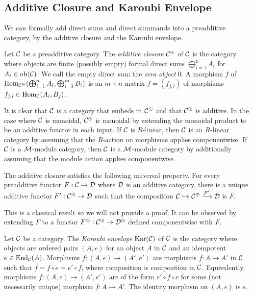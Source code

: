 \subsection*{Additive Closure and Karoubi Envelope}

We can formally add direct sums and direct summands into a preadditive category, by the additive closure and the Karoubi envelope.

\begin{definition}
    Let $\mathcal{C}$ be a preadditive category. The \textit{additive closure} $\mathcal{C}^\oplus$ of $\mathcal{C}$ is the category where objects are finite (possibly empty) formal direct sums $\bigoplus_{i=1}^n A_i$ for $A_i \in \operatorname{ob}(\mathcal{C})$. We call the empty direct sum the \textit{zero object} $0$. A morphism $f$ of $\operatorname{Hom}_{\mathcal{C}^\oplus}(\bigoplus_{i=1}^n A_i, \bigoplus_{i=1}^m B_i)$ is an $m \times n$ matrix $f = (f_{j,i})$ of morphisms $f_{j,i} \in \operatorname{Hom}_{\mathcal{C}}(A_i, B_j)$.
\end{definition}

It is clear that $\mathcal{C}$ is a category that embeds in $\mathcal{C}^\oplus$ and that $\mathcal{C}^\oplus$ is additive. In the case where $\mathcal{C}$ is monoidal, $\mathcal{C}^\oplus$ is monoidal by extending the monoidal product to be an additive functor in each input. If $\mathcal{C}$ is $R$-linear, then $\mathcal{C}$ is an $R$-linear category by assuming that the $R$-action on morphisms applies componentwise. If $\mathcal{C}$ is a $\mathcal{M}$-module category, then $\mathcal{C}$ is a $\mathcal{M}$-module category by additionally assuming that the module action applies componentwise.

\begin{lemma}
    The additive closure satisfies the following universal property. For every preadditive functor $F: \mathcal{C} \to \mathcal{D}$ where $\mathcal{D}$ is an additive category, there is a unique additive functor $F': \mathcal{C}^\oplus \to \mathcal{D}$ such that the composition $\mathcal{C} \hookrightarrow \mathcal{C}^\oplus \xrightarrow{F'} \mathcal{D}$ is $F$.
\end{lemma}

This is a classical result so we will not provide a proof. It can be observed by extending $F$ to a functor $F^\oplus: \mathcal{C}^\oplus \to \mathcal{D}^\oplus$ defined componentwise with $F$.

\begin{definition}
    Let $\mathcal{C}$ be a category. The \textit{Karoubi envelope} $\operatorname{Kar}(\mathcal{C})$ of $\mathcal{C}$ is the category where objects are ordered pairs $(A,e)$ for an object $A$ in $\mathcal{C}$ and an idempotent $e \in \operatorname{End}_{\mathcal{C}}(A)$.  Morphisms $f: (A, e) \to (A', e')$ are morphisms $f:A \to A'$ in $\mathcal{C}$ such that $f = f \circ e = e' \circ f$, where composition is composition in $\mathcal{C}$. Equivalently, morphisms $f: (A, e) \to (A', e')$ are of the form $e'\circ f \circ e$ for some (not necessarily unique) morphism $f: A \to A'$. The identity morphism on $(A,e)$ is $e$.
\end{definition}

